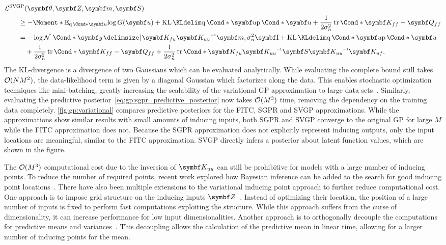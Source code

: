 \begin{align}
    \begin{split}
        \label{eq:gp:svgp_bound_2}
        \MoveEqLeft\Lc^{\text{SVGP}}(\mat{\theta}, \mat{Z}, \mat{m}, \mat{S}) \\
        &\geq -\Moment*{\E_{\Variat*{\mat{u}}}}{\log G(\mat{u})} + \KL{\Variat*{\mat{u}}}{\Prob*{\mat{u}}} + \frac{1}{2\sigma_n^2}\Fun*{\tr}{\mat{K_{ff}} - \mat{Q_{ff}}} \\
        &=
        -\log \Gaussian*{\mat{y} \given \mat{K_{fu}}\mat{K_{uu}}\inv \mat{m}, \sigma_n^2 \Eye}
        + \KL{\Variat*{\mat{u}}}{\Prob*{\mat{u}}} \\
        &\quad + \frac{1}{2\sigma_n^2} \Fun*{\tr}{\mat{K_{ff}} - \mat{Q_{ff}}}
        + \frac{1}{2\sigma_n^2} \Fun*{\tr}{\mat{K_{fu}}\mat{K_{uu}}\inv \mat{S}\mat{K_{uu}}\inv \mat{K_{uf}}}.
    \end{split}
\end{align}
The KL-divergence is a divergence of two Gaussians which can be evaluated analytically.
While evaluating the complete bound still takes $\operatorname{\mathcal{O}}(NM^2)$, the data-likelihood term is given by a diagonal Gaussian which factorizes along the data.
This enables stochastic optimization techniques like mini-batching, greatly increasing the scalability of the variational GP approximation to large data sets~\parencite{hensman_gaussian_2013}.
Similarly, evaluating the predictive posterior~\cref{eq:gp:sgpr_predictive_posterior} now takes $\operatorname{\mathcal{O}}(M^3)$ time, removing the dependency on the training data completely.
\cref{fig:gp:variational} compares predictive posteriors for the FITC, SGPR and SVGP approximations.
While the approximations show similar results with small amounts of inducing inputs, both SGPR and SVGP converge to the original GP for large $M$ while the FITC approximation does not.
Because the SGPR approximation does not explicitly represent inducing outputs, only the input locations are meaningful, similar to the FITC approximation.
SVGP directly infers a posterior about latent function values, which are shown in the figure.

The $\operatorname{\mathcal{O}}(M^3)$ computational cost due to the inversion of $\mat{K_{uu}}$ can still be prohibitive for models with a large number of inducing points.
To reduce the number of required points, recent work explored how Bayesian inference can be added to the search for good inducing point locations~\parencite{hensman_mcmc_2015,rossi_rethinking_2020}.
There have also been multiple extensions to the variational inducing point approach to further reduce computational cost.
One approach is to impose grid structure on the inducing inputs $\mat{Z}$~\parencite{wilson_kernel_2015}.
Instead of optimizing their location, the position of a large number of inputs is fixed to perform fast computations exploiting the structure.
While this approach suffers from the curse of dimensionality, it can increase performance for low input dimensionalities.
Another approach is to orthogonally decouple the computations for predictive means and variances~\parencite{shi_sparse_2020,salimbeni_orthogonally_2018,cheng_variational_2017}.
This decoupling allows the calculation of the predictive mean in linear time, allowing for a larger number of inducing points for the mean.



